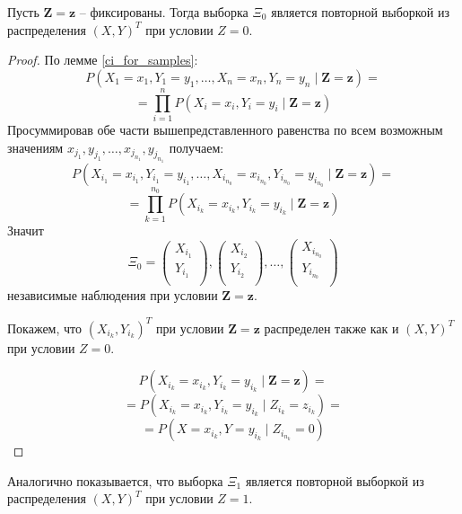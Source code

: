 \begin{theorem}
    Пусть $\mathbf{Z}=\mathbf{z}$ -- фиксированы. Тогда выборка $\Xi_0$ является повторной выборкой из распределения $(X,Y)^T$ при условии $Z=0$.
\end{theorem}
\begin{proof}
    По лемме \ref{ci_for_samples}:
    $$
    P(X_1=x_1,Y_1=y_1,\ldots,X_n=x_n,Y_n=y_n \mid \mathbf{Z}=\mathbf{z})=
    $$
    $$
    =\prod_{i=1}^n P(X_i=x_i, Y_i=y_i \mid \mathbf{Z}=\mathbf{z})
    $$
    Просуммировав обе части вышепредставленного равенства по всем возможным значениям 
    $x_{j_1}, y_{j_1}, \ldots, x_{j_{n_1}},y_{j_{n_1}}$ получаем:
    $$
    P(X_{i_1}=x_{i_1},Y_{i_1}=y_{i_1},\ldots,X_{i_{n_0}}=x_{i_{n_0}},Y_{i_{n_0}}=y_{i_{n_0}} \mid \mathbf{Z}=\mathbf{z})=
    $$
    $$
    =\prod_{k=1}^{n_0} P(X_{i_k}=x_{i_k}, Y_{i_k}=y_{i_k} \mid \mathbf{Z}=\mathbf{z})
    $$
    Значит $$
    \Xi_0=
    \begin{pmatrix}
        X_{i_1} \\
        Y_{i_1} \\
    \end{pmatrix},
    \begin{pmatrix}
        X_{i_2} \\
        Y_{i_2} \\
    \end{pmatrix}, \ldots,
    \begin{pmatrix}
        X_{i_{n_0}} \\
        Y_{i_{n_0}} \\
    \end{pmatrix} 
    $$
    независимые наблюдения при условии $\mathbf{Z}=\mathbf{z}$.

    Покажем, что $(X_{i_k},Y_{i_k})^T$ при условии $\mathbf{Z}=\mathbf{z}$ распределен также как и 
    $(X,Y)^T$ при условии $Z=0$.

    $$
    P(X_{i_k}=x_{i_k}, Y_{i_k}=y_{i_k} \mid \mathbf{Z}=\mathbf{z}) = $$
    $$=P(X_{i_k}=x_{i_k}, Y_{i_k}=y_{i_k} \mid Z_{i_k}=z_{i_k}) = $$
    $$=P(X=x_{i_k}, Y=y_{i_k} \mid Z_{i_{n_k}}=0)$$
\end{proof}

Аналогично показывается, что выборка $\Xi_1$ является повторной выборкой из распределения $(X,Y)^T$ при условии $Z=1$.

